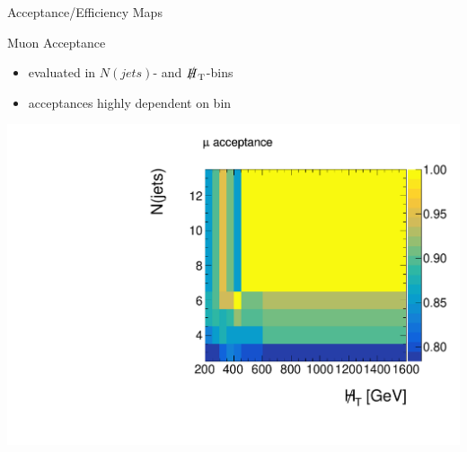 

\begin{frame}{Acceptance/Efficiency Maps}

\begin{block}{Muon Acceptance}
\begin{itemize}
\item evaluated in $N(\si{jets})$- and $\slashed H_{\si{T}}$-bins
\item acceptances highly dependent on bin
\end{itemize}
\end{block}

\begin{center}
\includegraphics[width = 0.5 \textwidth]{plots11/MuonAcceptance.pdf}
\end{center}

\end{frame}


